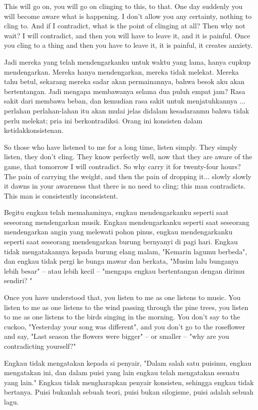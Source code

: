 \english
This will go on, you will go on clinging to this, to that. One day suddenly you will become aware what is happening. I don't allow you any certainty, nothing to cling to. And if I contradict, what is the point of clinging at all? Then why not wait? I will contradict, and then you will have to leave it, and it is painful. Once you cling to a thing and then you have to leave it, it is painful, it creates anxiety.

\bahasa
Jadi mereka yang telah mendengarkanku untuk waktu yang lama, hanya cupkup mendengarkan. Mereka hanya mendengarkan, mereka tidak melekat. Mereka tahu betul, sekarang mereka sadar akan permainannya, bahwa besok aku akan bertentangan. Jadi mengapa membawanya selama dua puluh empat jam? Rasa sakit dari membawa beban, dan kemudian rasa sakit untuk menjatuhkannya ... perlahan perlahan-lahan itu akan mulai jelas didalam kesadaranmu bahwa tidak perlu melekat; pria ini berkontradiksi. Orang ini konsisten dalam ketidakkonsistenan.

\english
So those who have listened to me for a long time, listen simply. They simply listen, they don't cling. They know perfectly well, now that they are aware of the game, that tomorrow I will contradict. So why carry it for twenty-four hours? The pain of carrying the weight, and then the pain of dropping it... slowly slowly it dawns in your awareness that there is no need to cling; this man contradicts. This man is consistently inconsistent.

\bahasa
Begitu engkau telah memahaminya, engkau mendengarkanku seperti saat seseorang mendengarkan musik. Engkau mendengarkanku seperti saat seseorang mendengarkan angin yang melewati pohon pinus, engkau mendengarkanku seperti saat seseorang mendengarkan burung bernyanyi di pagi hari. Engkau tidak mengatakannya kepada burung elang malam, "Kemarin lagumu berbeda", dan engkau tidak pergi ke bunga mawar dan berkata, "Musim lalu bunganya lebih besar" -- atau lebih kecil -- "mengapa engkau bertentangan dengan dirimu sendiri? "

\english
Once you have understood that, you listen to me as one listens to music. You listen to me as one listens to the wind passing through the pine trees, you listen to me as one listens to the birds singing in the morning. You don't say to the cuckoo, "Yesterday your song was different", and you don't go to the roseflower and say, "Last season the flowers were bigger" -- or smaller -- "why are you contradicting yourself?"

\bahasa
Engkau tidak mengatakan kepada si penyair, "Dalam salah satu puisimu, engkau mengatakan ini, dan dalam puisi yang lain engkau telah mengatakan sesuatu yang lain." Engkau tidak mengharapkan penyair konsisten, sehingga engkau tidak bertanya. Puisi bukanlah sebuah teori, puisi bukan silogisme, puisi adalah sebuah lagu.

